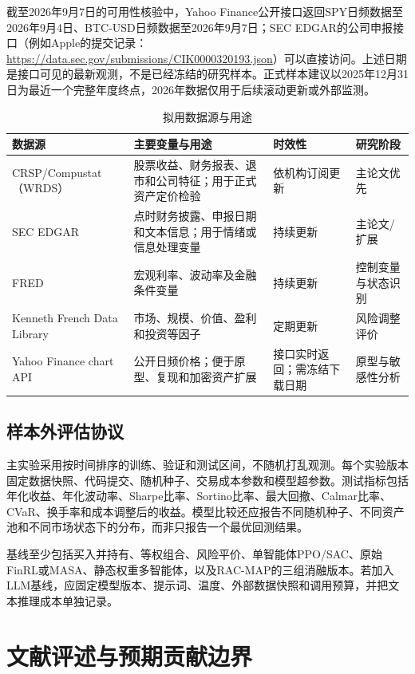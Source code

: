 \documentclass[10.5pt]{article}
\begin{document}
截至2026年9月7日的可用性核验中，Yahoo Finance公开接口返回SPY日频数据至2026年9月4日、BTC-USD日频数据至2026年9月7日；SEC EDGAR的公司申报接口（例如Apple的提交记录：\url{https://data.sec.gov/submissions/CIK0000320193.json}）可以直接访问。上述日期是接口可见的最新观测，不是已经冻结的研究样本。正式样本建议以2025年12月31日为最近一个完整年度终点，2026年数据仅用于后续滚动更新或外部监测。

\begin{table}[htbp]
\centering
\caption{拟用数据源与用途}
\label{tab:data}
\small
\begin{tabularx}{\textwidth}{lXll}
\toprule
数据源 & 主要变量与用途 & 时效性 & 研究阶段\\
\midrule
CRSP/Compustat（WRDS） & 股票收益、财务报表、退市和公司特征；用于正式资产定价检验 & 依机构订阅更新 & 主论文优先 \\
SEC EDGAR & 点时财务披露、申报日期和文本信息；用于情绪或信息处理变量 & 持续更新 & 主论文/扩展 \\
FRED & 宏观利率、波动率及金融条件变量 & 持续更新 & 控制变量与状态识别 \\
Kenneth French Data Library & 市场、规模、价值、盈利和投资等因子 & 定期更新 & 风险调整评价 \\
Yahoo Finance chart API & 公开日频价格；便于原型、复现和加密资产扩展 & 接口实时返回；需冻结下载日期 & 原型与敏感性分析 \\
\bottomrule
\end{tabularx}
\end{table}

\subsection{样本外评估协议}

主实验采用按时间排序的训练、验证和测试区间，不随机打乱观测。每个实验版本固定数据快照、代码提交、随机种子、交易成本参数和模型超参数。测试指标包括年化收益、年化波动率、Sharpe比率、Sortino比率、最大回撤、Calmar比率、CVaR、换手率和成本调整后的收益。模型比较还应报告不同随机种子、不同资产池和不同市场状态下的分布，而非只报告一个最优回测结果。

基线至少包括买入并持有、等权组合、风险平价、单智能体PPO/SAC、原始FinRL或MASA、静态权重多智能体，以及RAC-MAP的三组消融版本。若加入LLM基线，应固定模型版本、提示词、温度、外部数据快照和调用预算，并把文本推理成本单独记录。

\section{文献评述与预期贡献边界}
\end{document}
